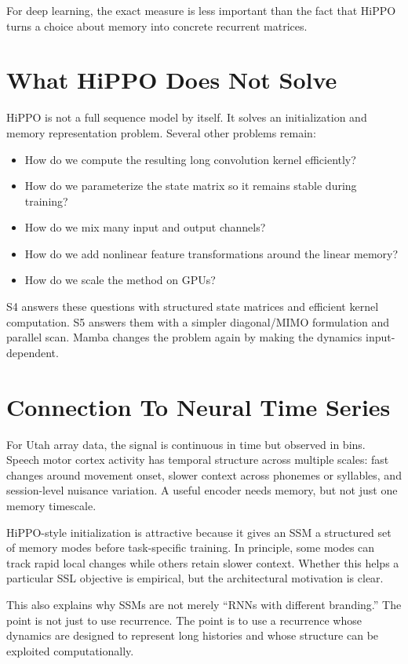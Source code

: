 For deep learning, the exact measure is less important than the fact that HiPPO turns a
choice about memory into concrete recurrent matrices.

\section{What HiPPO Does Not Solve}

HiPPO is not a full sequence model by itself. It solves an initialization and memory
representation problem. Several other problems remain:

\begin{itemize}
  \item How do we compute the resulting long convolution kernel efficiently?
  \item How do we parameterize the state matrix so it remains stable during training?
  \item How do we mix many input and output channels?
  \item How do we add nonlinear feature transformations around the linear memory?
  \item How do we scale the method on GPUs?
\end{itemize}

S4 answers these questions with structured state matrices and efficient kernel
computation. S5 answers them with a simpler diagonal/MIMO formulation and parallel scan.
Mamba changes the problem again by making the dynamics input-dependent.

\section{Connection To Neural Time Series}

For Utah array data, the signal is continuous in time but observed in bins. Speech motor
cortex activity has temporal structure across multiple scales: fast changes around
movement onset, slower context across phonemes or syllables, and session-level nuisance
variation. A useful encoder needs memory, but not just one memory timescale.

HiPPO-style initialization is attractive because it gives an SSM a structured set of
memory modes before task-specific training. In principle, some modes can track rapid
local changes while others retain slower context. Whether this helps a particular SSL
objective is empirical, but the architectural motivation is clear.

This also explains why SSMs are not merely ``RNNs with different branding.'' The point is
not just to use recurrence. The point is to use a recurrence whose dynamics are designed
to represent long histories and whose structure can be exploited computationally.

